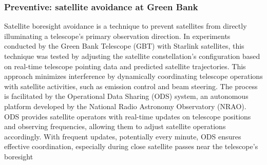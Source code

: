 
\subsubsection{Preventive: satellite avoidance at Green Bank}
\label{subsubsec:avoidance}
Satellite boresight avoidance is a technique to prevent satellites from directly illuminating a telescope's primary observation direction. In experiments conducted by the Green Bank Telescope (GBT) with Starlink satellites, this technique was tested \citep{nhan2024spectrumcoexistencedemonstrationeffectiveness} by adjusting the satellite constellation's configuration based on real-time telescope pointing data and predicted satellite trajectories. This approach minimizes interference by dynamically coordinating telescope operations with satellite activities, such as emission control and beam steering. The process is facilitated by the Operational Data Sharing (ODS) system, an autonomous platform developed by the National Radio Astronomy Observatory (NRAO). ODS provides satellite operators with real-time updates on telescope positions and observing frequencies, allowing them to adjust satellite operations accordingly. With frequent updates, potentially every minute, ODS ensures effective coordination, especially during close satellite passes near the telescope’s boresight

